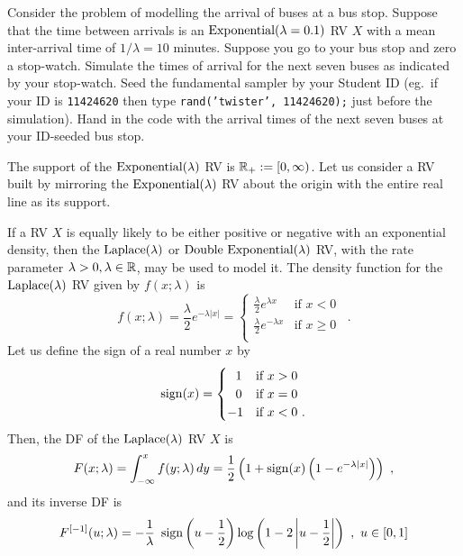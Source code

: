 \begin{labwork}\label{LW:Next7Buses}
Consider the problem of modelling the arrival of buses at a bus stop.  Suppose that the time between arrivals is an $\mbox{{\rm Exponential}}(\lambda=0.1)$ RV $X$ with a mean inter-arrival time of $1/\lambda=10$ minutes.  Suppose you go to your bus stop and zero a stop-watch.  Simulate the times of arrival for the next seven buses as indicated by your stop-watch.  Seed the fundamental sampler by your Student ID (eg.~if your ID is {\tt 11424620} then type {\tt rand('twister', 11424620);} just before the simulation).  Hand in the code with the arrival times of the next seven buses at your ID-seeded bus stop.
\end{labwork}

The support of the $\mbox{{\rm Exponential}}(\lambda)$ RV is $\mathbb{R}_+ := [0,\infty)$.  Let us consider a RV built by mirroring the $\mbox{{\rm Exponential}}(\lambda)$ RV about the origin with the entire real line as its support.
\begin{model}
If a RV $X$ is equally likely to be either positive or negative with an exponential density, then the $\mbox{{\rm Laplace}}(\lambda)$ or $\mbox{{\rm Double~Exponential}}(\lambda)$ RV, with the rate parameter $\lambda>0, \lambda \in \mathbb{R}$, may be used to model it.  The density function for the $\mbox{{\rm Laplace}}(\lambda)$ RV given by $f(x; \lambda)$ is
\begin{equation}\label{E:Laplacepdf}
f(x; \lambda) = \frac{\lambda}{2} e^{- \lambda |x|} =
\begin{cases}
 \frac{\lambda}{2} e^{ \lambda x} & \text{if $x < 0$} \\
 \frac{\lambda}{2} e^{- \lambda x} & \text{if $x \geq 0$} \\
\end{cases}
\enspace .
\end{equation}
Let us define the sign of a real number $x$ by
\[
\operatorname{sign}(x) =
\begin{cases}
~~1 & \text{if $x > 0$} \\
~~0 & \text{if $x = 0$} \\
-1 & \text{if $x < 0$}  \ . \\
\end{cases}
\]
Then, the DF of the $\mbox{{\rm Laplace}}(\lambda)$ RV $X$ is
\begin{equation} \label{E:Laplacecdf}
F(x; \lambda) = \int_{-\infty}^{x} f(y; \lambda)\,dy = \frac{1}{2}\left(1+ \sign(x) \left(1-e^{- \lambda |x|}\right) \right) \ ,
\end{equation}
and its inverse DF is
\begin{equation}\label{E:LaplaceInvcdf}
F^{[-1]}(u;\lambda) = - \frac{1}{\lambda} \ \sign\left(u-\frac{1}{2}\right) \log \left(1 - 2 \left|u-\frac{1}{2} \right| \right) \ , \ u \in [0,1]
\end{equation}
\end{model}

